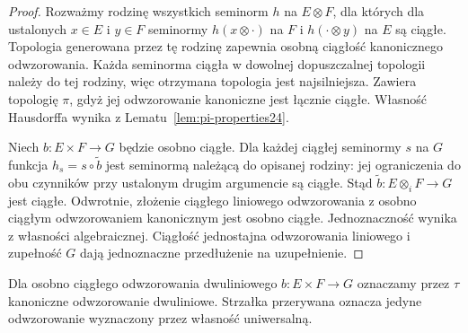 \begin{proof}
Rozważmy rodzinę wszystkich seminorm $h$ na
$E\otimes F$, dla których dla ustalonych $x\in E$
i $y\in F$ seminormy $h(x\otimes\cdot)$ na $F$
i $h(\cdot\otimes y)$ na $E$ są ciągłe.
Topologia generowana przez tę rodzinę zapewnia
osobną ciągłość kanonicznego odwzorowania.
Każda seminorma ciągła w dowolnej dopuszczalnej
topologii należy do tej rodziny, więc otrzymana
topologia jest najsilniejsza. Zawiera topologię
$\pi$, gdyż jej odwzorowanie kanoniczne jest
łącznie ciągłe. Własność Hausdorffa wynika z
Lematu~\ref{lem:pi-properties24}.

Niech $b:E\times F\to G$ będzie osobno ciągłe.
Dla każdej ciągłej seminormy $s$ na $G$ funkcja
$h_s=s\circ\widetilde b$ jest seminormą należącą
do opisanej rodziny: jej ograniczenia do obu
czynników przy ustalonym drugim argumencie są
ciągłe. Stąd $\widetilde b:E\otimes_i F\to G$
jest ciągłe. Odwrotnie, złożenie ciągłego liniowego
odwzorowania z osobno ciągłym odwzorowaniem
kanonicznym jest osobno ciągłe. Jednoznaczność
wynika z własności algebraicznej. Ciągłość
jednostajna odwzorowania liniowego i zupełność
$G$ dają jednoznaczne przedłużenie na uzupełnienie.
\end{proof}

Dla osobno ciągłego odwzorowania dwuliniowego $b:E\times F\to G$ oznaczamy przez $\tau$ kanoniczne odwzorowanie dwuliniowe. Strzałka przerywana oznacza jedyne odwzorowanie wyznaczony przez własność uniwersalną.
\begin{center}
\end{center}


